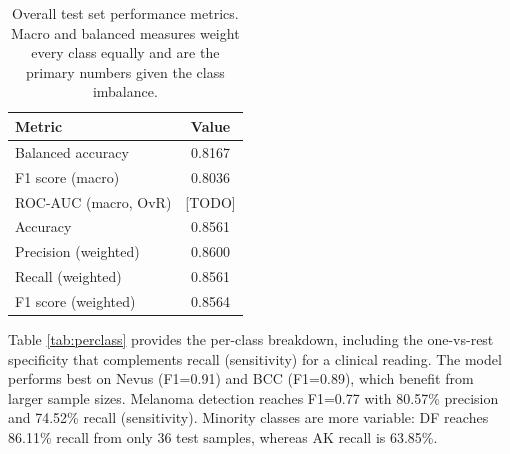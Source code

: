 \begin{table}[t]
    \centering
    \caption{Overall test set performance metrics. Macro and balanced measures
        weight every class equally and are the primary numbers given the class
        imbalance.}
    \label{tab:results}
    \begin{tabular}{lc}
        \toprule
        Metric               & Value  \\
        \midrule
        Balanced accuracy    & 0.8167 \\
        F1 score (macro)     & 0.8036 \\
        ROC-AUC (macro, OvR) & [TODO] \\
        \midrule
        Accuracy             & 0.8561 \\
        Precision (weighted) & 0.8600 \\
        Recall (weighted)    & 0.8561 \\
        F1 score (weighted)  & 0.8564 \\
        \bottomrule
    \end{tabular}
\end{table}

Table \ref{tab:perclass} provides the per-class breakdown, including the
one-vs-rest specificity that complements recall (sensitivity) for a clinical
reading. The model performs best on Nevus (F1=0.91) and BCC (F1=0.89), which
benefit from larger sample sizes. Melanoma detection reaches F1=0.77 with
80.57\% precision and 74.52\% recall (sensitivity). Minority classes are more
variable: DF reaches 86.11\% recall from only 36 test samples, whereas AK
recall is 63.85\%.

